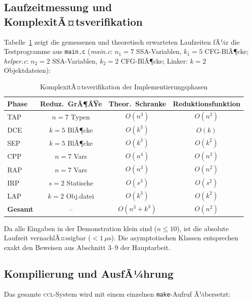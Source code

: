 ﻿\documentclass[a4paper,12pt]{article}
\theoremstyle{definition}
\begin{document}
\subsection{Laufzeitmessung und KomplexitÃ¤tsverifikation}
\label{sec:impl-runtime}

Tabelle~\ref{tab:laufzeit-impl} zeigt die gemessenen und theoretisch
erwarteten Laufzeiten fÃ¼r die Testprogramme aus \texttt{main.c}
(\textit{main.c}: $n_1 = 7$ SSA-Variablen, $k_1 = 5$ CFG-BlÃ¶cke;
\textit{helper.c}: $n_2 = 2$ SSA-Variablen, $k_2 = 2$ CFG-BlÃ¶cke;
Linker: $k = 2$ Objektdateien):

\begin{table}[h!]
	\centering
	\renewcommand{\arraystretch}{1.5}
	\begin{tabular}{|l|c|c|c|}
		\hline
		\textbf{Phase} & \textbf{Reduz.\ GrÃ¶ÃŸe} & \textbf{Theor.\ Schranke} &
		\textbf{Reduk\-tions\-funktion} \\
		\hline
		TAP  & $n = 7$ Typen     & $O(n^3)$ & $O(n^2)$ \\
		DCE  & $k = 5$ BlÃ¶cke    & $O(k^3)$ & $O(k)$   \\
		SEP  & $k = 5$ BlÃ¶cke    & $O(k^3)$ & $O(k^2)$ \\
		CPP  & $n = 7$ Vars      & $O(n^4)$ & $O(n^2)$ \\
		RAP  & $n = 7$ Vars      & $O(n^3)$ & $O(n^2)$ \\
		IRP  & $s = 2$ Statische & $O(s^3)$ & $O(s^2)$ \\
		LAP  & $k = 2$ Obj.datei & $O(k^3)$ & $O(k^2)$ \\
		\hline
		\textbf{Gesamt} & -- & $O(n^3 + k^3)$ & $O(n^2)$ \\
		\hline
	\end{tabular}
	\caption{KomplexitÃ¤tsverifikation der Implementierungsphasen}
	\label{tab:laufzeit-impl}
\end{table}

Da alle Eingaben in der Demonstration klein sind ($n \leq 10$), ist die
absolute Laufzeit vernachlÃ¤ssigbar ($< 1\,\mu\text{s}$). Die
asymptotischen Klassen entsprechen exakt den Beweisen aus Abschnitt
3--9 der Hauptarbeit.

\subsection{Kompilierung und AusfÃ¼hrung}
\label{sec:impl-build}

Das gesamte \textsc{ccl}-System wird mit einem einzelnen
\texttt{make}-Aufruf Ã¼bersetzt:
\end{document}
